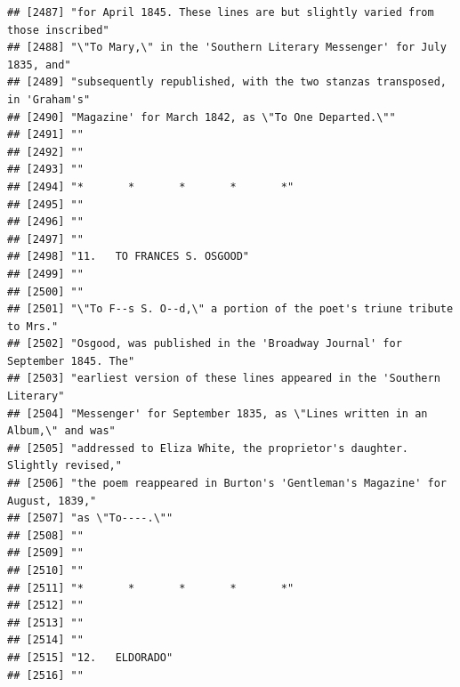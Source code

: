 \documentclass{article}\usepackage[]{graphicx}\usepackage[]{color}
\makeatletter
\newenvironment{kframe}{%
 \def\at@end@of@kframe{}%
 \ifinner\ifhmode%
  \def\at@end@of@kframe{\end{minipage}}%
  \begin{minipage}{\columnwidth}%
 \fi\fi%
 \def\FrameCommand##1{\hskip\@totalleftmargin \hskip-\fboxsep
 \colorbox{shadecolor}{##1}\hskip-\fboxsep
     \hskip-\linewidth \hskip-\@totalleftmargin \hskip\columnwidth}%
 \MakeFramed {\advance\hsize-\width
   \@totalleftmargin\z@ \linewidth\hsize
   \@setminipage}}%
 {\par\unskip\endMakeFramed%
 \at@end@of@kframe}
\newenvironment{knitrout}{}{} %
\makeatother
\begin{document}
\begin{knitrout}
\begin{kframe}
\begin{verbatim}
## [2487] "for April 1845. These lines are but slightly varied from those inscribed"    
## [2488] "\"To Mary,\" in the 'Southern Literary Messenger' for July 1835, and"        
## [2489] "subsequently republished, with the two stanzas transposed, in 'Graham's"     
## [2490] "Magazine' for March 1842, as \"To One Departed.\""                           
## [2491] ""                                                                            
## [2492] ""                                                                            
## [2493] ""                                                                            
## [2494] "*       *       *       *       *"                                           
## [2495] ""                                                                            
## [2496] ""                                                                            
## [2497] ""                                                                            
## [2498] "11.   TO FRANCES S. OSGOOD"                                                  
## [2499] ""                                                                            
## [2500] ""                                                                            
## [2501] "\"To F--s S. O--d,\" a portion of the poet's triune tribute to Mrs."         
## [2502] "Osgood, was published in the 'Broadway Journal' for September 1845. The"     
## [2503] "earliest version of these lines appeared in the 'Southern Literary"          
## [2504] "Messenger' for September 1835, as \"Lines written in an Album,\" and was"    
## [2505] "addressed to Eliza White, the proprietor's daughter. Slightly revised,"      
## [2506] "the poem reappeared in Burton's 'Gentleman's Magazine' for August, 1839,"    
## [2507] "as \"To----.\""                                                              
## [2508] ""                                                                            
## [2509] ""                                                                            
## [2510] ""                                                                            
## [2511] "*       *       *       *       *"                                           
## [2512] ""                                                                            
## [2513] ""                                                                            
## [2514] ""                                                                            
## [2515] "12.   ELDORADO"                                                              
## [2516] ""                                                                            

\end{verbatim}
\end{kframe}
\end{knitrout}
\end{document}
